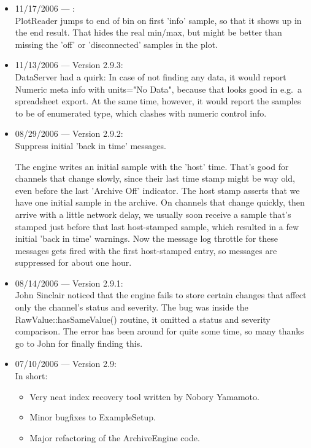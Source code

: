 \begin{itemize}
\item 11/17/2006 --- :\\
PlotReader jumps to end of bin on first 'info' sample,
so that it shows up in the end result.
That hides the real min/max, but might be better than missing
the 'off' or 'disconnected' samples in the plot.

\item 11/13/2006 --- Version 2.9.3:\\
DataServer had a quirk:
In case of not finding any data, it would report
Numeric meta info with units="No Data",
because that looks good in e.g.\ a spreadsheet export.
At the same time, however, it would report the samples
to be of enumerated type, which clashes with numeric
control info.

\item 08/29/2006 --- Version 2.9.2:\\
Suppress initial 'back in time' messages.

The engine writes an initial sample with the 'host' time.
That's good for channels that change slowly, since their
last time stamp might be way old, even before the last
'Archive Off' indicator. The host stamp asserts that we
have one initial sample in the archive.
On channels that change quickly, then arrive with a little
network delay, we usually soon receive a sample that's stamped
just before that last host-stamped sample, which resulted
in a few initial 'back in time' warnings.
Now the message log throttle for these messages gets fired
with the first host-stamped entry, so messages are suppressed
for about one hour.

\item 08/14/2006 --- Version 2.9.1:\\
John Sinclair noticed that the engine fails to store certain
changes that affect only the channel's status and severity.
The bug was inside the RawValue::hasSameValue() routine, it
omitted a status and severity comparison. The error has been
around for quite some time, so many thanks go to John for
finally finding this.

\item 07/10/2006 --- Version 2.9:\\
In short:
\begin{itemize}
\item Very neat index recovery tool written by Nobory Yamamoto.
\item Minor bugfixes to ExampleSetup.
\item Major refactoring of the ArchiveEngine code.
\end{itemize}


\end{itemize}

